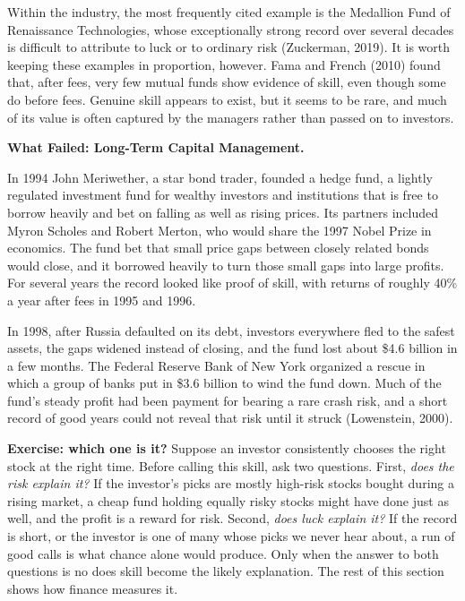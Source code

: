 \begin{itemize}
\begin{enumerate}
  \end{enumerate}

  Within the industry, the most frequently cited example is the Medallion
  Fund of Renaissance Technologies, whose exceptionally strong record over
  several decades is difficult to attribute to luck or to ordinary risk
  (Zuckerman, 2019). It is worth keeping these examples in proportion,
  however. Fama and French (2010) found that, after fees, very few mutual
  funds show evidence of skill, even though some do before fees. Genuine
  skill appears to exist, but it seems to be rare, and much of its value is
  often captured by the managers rather than passed on to investors.
  
  
\end{itemize}




\begin{callout}
\textbf{What Failed: Long-Term Capital Management.} 

In 1994 John Meriwether, a star bond trader, founded a hedge fund, a lightly regulated investment fund for wealthy investors and institutions that is free to borrow heavily and bet on falling as well as rising prices. Its partners included Myron Scholes and Robert Merton, who would share the 1997 Nobel Prize in economics. The fund bet that small price gaps between closely related bonds would close, and it borrowed heavily to turn those small gaps into large profits. For several years the record looked like proof of skill, with returns of roughly 40\% a year after fees in 1995 and 1996. 

In 1998, after Russia defaulted on its debt, investors everywhere fled to the safest assets, the gaps widened instead of closing, and the fund lost about \$4.6 billion in a few months. The Federal Reserve Bank of New York organized a rescue in which a group of banks put in \$3.6 billion to wind the fund down. Much of the fund's steady profit had been payment for bearing a rare crash risk, and a short record of good years could not reveal that risk until it struck (Lowenstein, 2000).
\end{callout}



\noindent\textbf{Exercise: which one is it?} Suppose an investor
consistently chooses the right stock at the right time. Before calling this
skill, ask two questions. First, \emph{does the risk explain it?} If the
investor's picks are mostly high-risk stocks bought during a rising market,
a cheap fund holding equally risky stocks might have done just as well, and
the profit is a reward for risk. Second, \emph{does luck explain it?} If the
record is short, or the investor is one of many whose picks we never hear
about, a run of good calls is what chance alone would produce. Only when the
answer to both questions is no does skill become the likely explanation. The
rest of this section shows how finance measures it.


